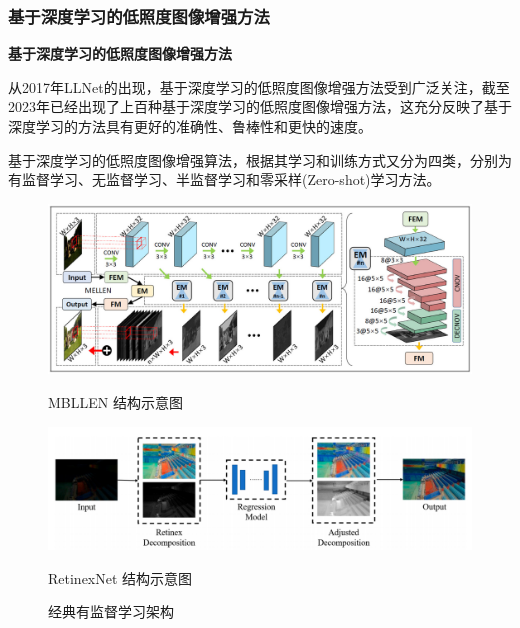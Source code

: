 \documentclass[CJK,aspectratio=169]{beamer}  %
\begin{document}
	\subsubsection{基于深度学习的低照度图像增强方法}
	
	\begin{frame}
		{ \yahei \textbf{基于深度学习的低照度图像增强方法}}
		
		{ \yahei 从2017年LLNet\textcolor{blue}{\citep{lore2017llnet}}的出现，基于深度学习的低照度图像增强方法受到广泛关注，截至2023年已经出现了上百种基于深度学习的低照度图像增强方法，这充分反映了基于深度学习的方法具有更好的准确性、鲁棒性和更快的速度。}
		
		\vspace{0.1cm}
		
		{ \yahei 基于深度学习的低照度图像增强算法，根据其学习和训练方式又分为四类，分别为有监督学习、无监督学习、半监督学习和零采样(Zero-shot)学习方法\textcolor{blue}{\citep{tang2023low}}。}
		
		\vspace{0.1cm}
		
		\begin{figure}
			\centering
			\setlength{\abovecaptionskip}{-0.05cm}			
			\begin{minipage}{.4\columnwidth}
				\setlength{\abovecaptionskip}{-0.05cm}
				\centering 
				\includegraphics[width=\columnwidth]{picture/LLIE/MBLLEN/MBLLEN Architecture}
				\caption{
					\label{fig: MBLLEN} 
					\tiny MBLLEN 结构示意图
				}
			\end{minipage}
			\begin{minipage}{.4\columnwidth}
				\setlength{\abovecaptionskip}{-0.05cm}
				\centering 
				\includegraphics[width=\columnwidth]{picture/LLIE/RetinexNet/RetinexNet}
				\caption{
					\label{fig: RetinexNet} 
					\tiny RetinexNet 结构示意图
				}
			\end{minipage}
			\captionsetup{font=scriptsize}
			\caption{
				\label{fig: Supervised Learning}
				\tiny 经典有监督学习架构
			}
		\end{figure}
		
	\end{frame}
	
\end{document}
